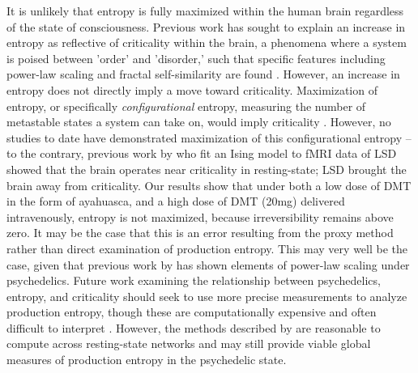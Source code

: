 It is unlikely that entropy is fully maximized within the human brain regardless of the state of consciousness. Previous work has sought to explain an increase in entropy as reflective of criticality within the brain, a phenomena where a system is poised between 'order' and 'disorder,' such that specific features including power-law scaling and fractal self-similarity are found \parencite{Bak1999, Carhart-Harris2019a, Petermann2009}. However, an increase in entropy does not directly imply a move toward criticality. Maximization of entropy, or specifically \textit{configurational} entropy, measuring the number of metastable states a system can take on, would imply criticality \parencite{Haldeman2005}. However, no studies to date have demonstrated maximization of this configurational entropy -- to the contrary, previous work by \textcite{Ruffini2023} who fit an Ising model to fMRI data of LSD showed that the brain operates near criticality in resting-state; LSD brought the brain away from criticality. Our results show that under both a low dose of DMT in the form of ayahuasca, and a high dose of DMT (20mg) delivered intravenously, entropy is not maximized, because irreversibility remains above zero. It may be the case that this is an error resulting from the proxy method rather than direct examination of production entropy. This may very well be the case, given that previous work by \textcite{Atasoy2017} has shown elements of power-law scaling under psychedelics. Future work examining the relationship between psychedelics, entropy, and criticality should seek to use more precise measurements to analyze production entropy, though these are computationally expensive and often difficult to interpret \parencite{Lynn2021,Seif2021,Deco2021a}. However, the methods described by \textcite{Lynn2021} are reasonable to compute across resting-state networks and may still provide viable global measures of production entropy in the psychedelic state.

